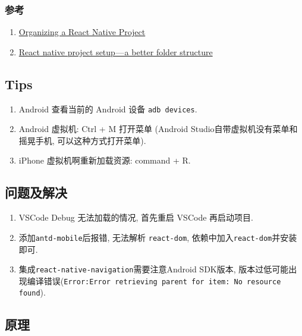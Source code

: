 \subsubsection{参考}\label{ux53c2ux8003-2}

\begin{enumerate}
\def\labelenumi{\arabic{enumi}.}
\tightlist
\item
  \href{https://medium.com/the-react-native-log/organizing-a-react-native-project-9514dfadaa0}{Organizing
  a React Native Project}
\item
  \href{https://hackernoon.com/manage-react-native-project-folder-structure-and-simplify-the-code-c98da77ef792}{React
  native project setup --- a better folder structure}
\end{enumerate}

\subsection{Tips}\label{tips-1}

\begin{enumerate}
\def\labelenumi{\arabic{enumi}.}
\tightlist
\item
  Android 查看当前的 Android 设备 \lstinline!adb devices!.
\item
  Android 虚拟机: Ctrl + M 打开菜单 (Android
  Studio自带虚拟机没有菜单和摇晃手机, 可以这种方式打开菜单).
\item
  iPhone 虚拟机啊重新加载资源: command + R.
\end{enumerate}

\subsection{问题及解决}\label{ux95eeux9898ux53caux89e3ux51b3}

\begin{enumerate}
\def\labelenumi{\arabic{enumi}.}
\tightlist
\item
  VSCode Debug 无法加载的情况, 首先重启 VSCode 再启动项目.
\item
  添加\lstinline!antd-mobile!后报错, 无法解析 \lstinline!react-dom!,
  依赖中加入\lstinline!react-dom!并安装即可.
\item
  集成\lstinline!react-native-navigation!需要注意Android SDK版本,
  版本过低可能出现编译错误(\lstinline!Error:Error retrieving parent for item: No resource found!).
\end{enumerate}

\subsection{原理}\label{ux539fux7406}

